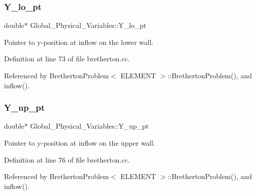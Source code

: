 \subsubsection{\texorpdfstring{Y\+\_\+lo\+\_\+pt}{Y\_lo\_pt}}
{\footnotesize\ttfamily double$\ast$ Global\+\_\+\+Physical\+\_\+\+Variables\+::\+Y\+\_\+lo\+\_\+pt}



Pointer to y-\/position at inflow on the lower wall. 



Definition at line 73 of file bretherton.\+cc.



Referenced by Bretherton\+Problem$<$ E\+L\+E\+M\+E\+N\+T $>$\+::\+Bretherton\+Problem(), and inflow().

\mbox{\label{namespaceGlobal__Physical__Variables_a75878a0c79c88065fd9031f273b62698}} 
\subsubsection{\texorpdfstring{Y\+\_\+up\+\_\+pt}{Y\_up\_pt}}
{\footnotesize\ttfamily double$\ast$ Global\+\_\+\+Physical\+\_\+\+Variables\+::\+Y\+\_\+up\+\_\+pt}



Pointer to y-\/position at inflow on the upper wall. 



Definition at line 76 of file bretherton.\+cc.



Referenced by Bretherton\+Problem$<$ E\+L\+E\+M\+E\+N\+T $>$\+::\+Bretherton\+Problem(), and inflow().

